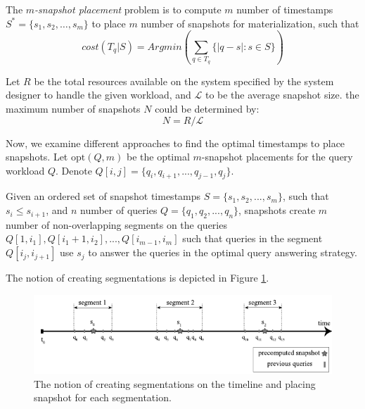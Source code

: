 		\begin{prop}
			The \emph{$m$-snapshot placement} problem is to compute $m$ number of timestamps $S^*=\{s_1, s_2, \dots, s_m\}$ to place $m$ number of snapshots for materialization, such that 
			$$cost(T_q|S)= Arg min(\sum_{q\in T_q}\{|q - s|:s \in S\})$$
		\label{prop:optimal_multiple_snapshot}
		\end{prop}

		\begin{prop} 
			Let $R$ be the total resources available on the system specified by the system designer to handle the given workload, and $\mathcal{L}$ to be the average snapshot size. the maximum number of snapshots $N$ could be determined by: $$N=R/\mathcal{L}$$
		\label{prop:optimal_number_segmentations}
		\end{prop}

		Now, we examine different approaches to find the optimal timestamps to place snapshots. Let $\mathrm{opt}(Q, m)$ be the optimal $m$-snapshot placements for the query workload $Q$. Denote $Q[i,j] = \{q_i,q_{i+1},...,q_{j-1},q_j\}$.

		\begin{prop} 
			Given an ordered set of snapshot timestamps $S=\{s_1,s_2,...,s_m\}$, such that $s_i \leq s_{i+1}$, and $n$ number of queries $Q = \{q_1,q_2,...,q_n\}$, snapshots create $m$ number of non-overlapping segments on the queries $Q[1,i_1],Q[i_1+1,i_2],...,Q[i_{m-1},i_m]$ such that queries in the segment $Q[i_j,i_{j+1}]$ use $s_j$ to answer the queries in the optimal query answering strategy.
		\label{prop:segmentation_of_queries}
		\end{prop}
		The notion of creating segmentations is depicted in Figure \ref{fig:segmentation}.

		\begin{figure}
			\centering
			\includegraphics[width=\textwidth]{figs/segmentations.pdf}
			\caption{The notion of creating segmentations on the timeline and placing snapshot for each segmentation.}
			\label{fig:segmentation}
		\end{figure}


